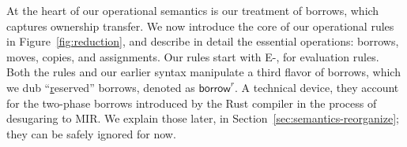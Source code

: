 \documentclass[acmsmall,screen]{acmart}
\newif\iflong
\newcommand{\sref}[1]{Section~\ref{sec:#1}}
\newcommand{\fref}[1]{Figure~\ref{fig:#1}}
\newcommand\kw[1]{\ensuremath{\mathsf{#1}}}
\newcommand\emborrow[2]{\ensuremath{\mathsf{borrow}^m\,#1\;#2}}
\begin{document}
\iflong
\begin{figure}
  \centering
  \smaller
  \begin{mathpar}
    \inferrule[A-Shorthand]{
      \ominus\; v_p
    }{
      v_p \text{ has no outer } \kw{loan}\text{s}
    }

    \inferrule[A-Scalar]{
      v = \kw{true} \text{ or }\kw{false}\text{ or } n_\mathsf{i32} \text{ or } n_\mathsf{u32}\text{ or } \ldots
    }{
      \ominus\; v
    }

    \inferrule[A-Tuple]{
      \ominus\; v_i
    }{
      \ominus\; (\vec v)
    }

    \inferrule[A-Constructor]{
      \ominus\; v_i
    }{
      \ominus\; C[\vec f = \vec v]
    }

    \inferrule[A-Borrow-M]{
    }{
    \ominus\; \emborrow\ell v
    }

    \inferrule[A-Borrow-R-S]{
    }{
    \ominus\; \kw{borrow}^{r,s} \ell
    }

    \inferrule[A-Bot]{
    }{
    \ominus\; \bot
    }
  \end{mathpar}
  \caption{Auxiliary Judgment: Absence of Outer Loans. We use shorthand notation $\ominus$ for this
  figure. Enforcing this
  criterion ensures that, at assignment-time, the memory we are about to write does not contained
  loaned-out data, as this would be unsound. This judgement is defined by omission, and is never
  valid for values of the form $\kw{loan}\;\_$. Such values, however, may appear underneath borrows,
  as the \textsc{A-Borrow-*} rules enforce no preconditions.}
  \label{fig:no-outer-loans}
\end{figure}
\fi

At the heart of our operational semantics is our treatment of borrows, which
captures ownership transfer.
We now introduce the core of our operational rules in \fref{reduction}, and describe in detail the
essential operations: borrows, moves, copies, and assignments.
Our rules start with \textsc{E-}, for evaluation rules.
Both the rules and our earlier syntax manipulate a
third flavor of borrows,
which we
dub ``\underline{r}eserved'' borrows, denoted as $\kw{borrow}^r$. A technical
device, they account for the two-phase borrows introduced by the Rust compiler in the
process of desugaring to MIR. We explain those later, in
\sref{semantics-reorganize}; they can be safely ignored for now.
\end{document}
